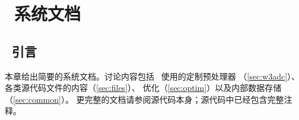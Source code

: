 \section{~系统文档} \label{chapt:sys}
\newcounters
\vssub
\subsection{~引言}
\vssub

本章给出简要的系统文档。讨论内容包括 \ws\ 使用的定制预处理器
（\para\ref{sec:w3adc}）、各类源代码文件的内容（\para\ref{sec:files}）、
优化（\para\ref{sec:optim}）以及内部数据存储（\para\ref{sec:common}）。
更完整的文档请参阅源代码本身；源代码中已经包含完整注释。




\pb




\pb








\bpage
